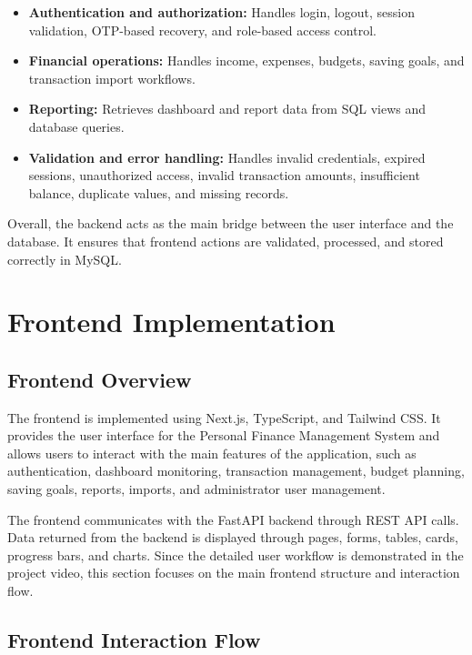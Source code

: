 \documentclass{article}
\begin{document}
\begin{itemize}
    \item \textbf{Authentication and authorization:} Handles login, logout, session validation, OTP-based recovery, and role-based access control.
    \item \textbf{Financial operations:} Handles income, expenses, budgets, saving goals, and transaction import workflows.
    \item \textbf{Reporting:} Retrieves dashboard and report data from SQL views and database queries.
    \item \textbf{Validation and error handling:} Handles invalid credentials, expired sessions, unauthorized access, invalid transaction amounts, insufficient balance, duplicate values, and missing records.
\end{itemize}

Overall, the backend acts as the main bridge between the user interface and the database. It ensures that frontend actions are validated, processed, and stored correctly in MySQL.

\section{Frontend Implementation}

\subsection{Frontend Overview}

The frontend is implemented using Next.js, TypeScript, and Tailwind CSS. It provides the user interface for the Personal Finance Management System and allows users to interact with the main features of the application, such as authentication, dashboard monitoring, transaction management, budget planning, saving goals, reports, imports, and administrator user management.

The frontend communicates with the FastAPI backend through REST API calls. Data returned from the backend is displayed through pages, forms, tables, cards, progress bars, and charts. Since the detailed user workflow is demonstrated in the project video, this section focuses on the main frontend structure and interaction flow.

\subsection{Frontend Interaction Flow}
\end{document}
